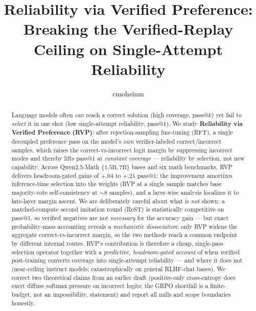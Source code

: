\documentclass[a4paper]{article}
\title{Reliability via Verified Preference: Breaking the Verified-Replay Ceiling on Single-Attempt Reliability}
\author{cmohsinm}
\date{}
\begin{document}
\maketitle

\begin{abstract}
Language models often \emph{can} reach a correct solution (high coverage, pass@$k$) yet fail to
\emph{select} it in one shot (low single-attempt reliability, pass@1). We study \textbf{Reliability via
Verified Preference (RVP)}: after rejection-sampling fine-tuning (RFT), a single decoupled
preference pass on the model's \emph{own} verifier-labeled correct/incorrect samples, which raises the
correct-vs-incorrect logit margin by suppressing incorrect modes and thereby lifts pass@1 at
\emph{constant coverage} --- reliability by selection, not new capability. Across Qwen2.5-Math
$\{1.5\text{B},7\text{B}\}$ bases and six math benchmarks, RVP delivers headroom-gated gains of $+.04$
to $+.21$ pass@1; the improvement amortizes inference-time selection into the weights (RVP at a single
sample matches base majority-vote self-consistency at $\sim\!8$ samples), and a layer-wise analysis
localizes it to late-layer margin ascent. We are deliberately careful about what is \emph{not} shown: a
matched-compute second imitation round (ReST) is statistically competitive on pass@1, so verified
negatives are not \emph{necessary} for the accuracy gain --- but exact probability-mass accounting reveals
a \emph{mechanistic dissociation}: only RVP widens the aggregate correct-vs-incorrect margin, so the two
methods reach a common endpoint by different internal routes. RVP's contribution is therefore a cheap,
single-pass selection operator together with a \emph{predictive, headroom-gated account} of when verified
post-training converts coverage into single-attempt reliability --- and where it does not (near-ceiling
instruct models; catastrophically on general RLHF-chat bases). We correct two theoretical claims from an
earlier draft (positive-only cross-entropy does exert diffuse softmax pressure on incorrect logits; the
GRPO shortfall is a finite-budget, not an impossibility, statement) and report all nulls and scope
boundaries honestly.
\end{abstract}





%



\end{document}
